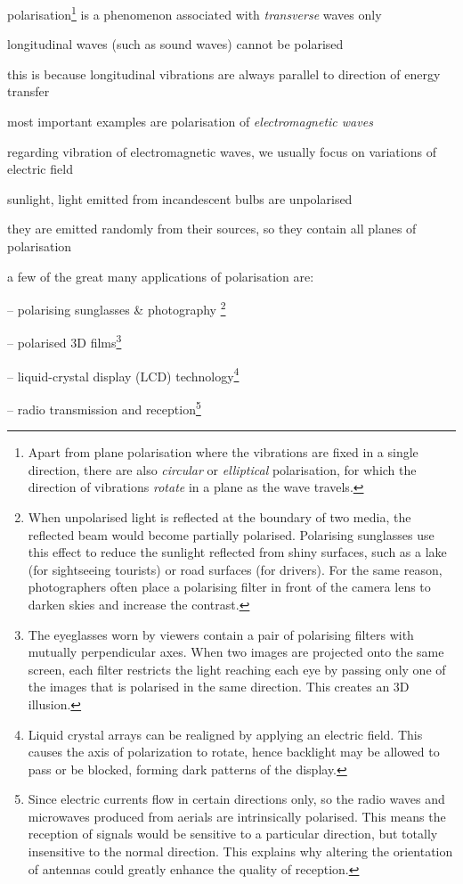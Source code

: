 \cmt polarisation\footnote{Apart from plane polarisation where the vibrations are fixed in a single direction, there are also \emph{circular} or \emph{elliptical} polarisation, for which the direction of vibrations \emph{rotate} in a plane as the wave travels.} is a phenomenon associated with \emph{transverse} waves only

longitudinal waves (such as sound waves) cannot be polarised

this is because longitudinal vibrations are always parallel to direction of energy transfer

\cmt most important examples are polarisation of \emph{electromagnetic waves}

regarding vibration of electromagnetic waves, we usually focus on variations of electric field

\cmt sunlight, light emitted from incandescent bulbs are unpolarised

they are emitted randomly from their sources, so they contain all planes of polarisation


\cmt a few of the great many applications of polarisation are:

\begin{compactitem}
	\item[--] polarising sunglasses \& photography \footnote{When unpolarised light is reflected at the boundary of two media, the reflected beam would become partially polarised. Polarising sunglasses use this effect to reduce the sunlight reflected from shiny surfaces, such as a lake (for sightseeing tourists) or road surfaces (for drivers). For the same reason, photographers often place a polarising filter in front of the camera lens to darken skies and increase the contrast.}
	
	\item[--] polarised 3D films\footnote{The eyeglasses worn by viewers contain a pair of polarising filters with mutually perpendicular axes. When two images are projected onto the same screen, each filter restricts the light reaching each eye by passing only one of the images that is polarised in the same direction. This creates an 3D illusion.}
	
	\item[--] liquid-crystal display (LCD) technology\footnote{Liquid crystal arrays can be realigned by applying an electric field. This causes the axis of polarization to rotate, hence backlight may be allowed to pass or be blocked, forming dark patterns of the display.}
	
	\item[--] radio transmission and reception\footnote{Since electric currents flow in certain directions only, so the radio waves and microwaves produced from aerials are intrinsically polarised. This means the reception of signals would be sensitive to a particular direction, but totally insensitive to the normal direction. This explains why altering the orientation of antennas could greatly enhance the quality of reception.}
\end{compactitem}

